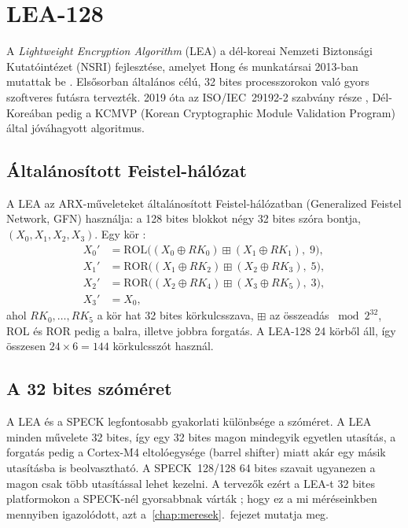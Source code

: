 \documentclass[a4paper,12pt]{report}
\theoremstyle{definition}
\theoremstyle{remark}
\begin{document}
\section{LEA-128}\label{sec:lea}

A \emph{Lightweight Encryption Algorithm} (LEA) a dél-koreai Nemzeti Biztonsági Kutatóintézet (NSRI) fejlesztése, amelyet Hong és munkatársai 2013-ban mutattak be \cite{Hong2013}. Elsősorban általános célú, 32 bites processzorokon való gyors szoftveres futásra tervezték. 2019 óta az ISO/IEC~29192-2 szabvány része \cite{ISO29192}, Dél-Koreában pedig a KCMVP (Korean Cryptographic Module Validation Program) által jóváhagyott algoritmus.

\subsection{Általánosított Feistel-hálózat}\label{sec:lea_kor}

A LEA az ARX-műveleteket általánosított Feistel-hálózatban (Generalized Feistel Network, GFN) használja: a 128 bites blokkot négy 32 bites szóra bontja, $(X_0, X_1, X_2, X_3)$. Egy kör \cite{Hong2013}:
\begin{align}
X_0' &= \text{ROL}\big((X_0 \oplus RK_0) \mathbin{\boxplus} (X_1 \oplus RK_1),\; 9\big), \\
X_1' &= \text{ROR}\big((X_1 \oplus RK_2) \mathbin{\boxplus} (X_2 \oplus RK_3),\; 5\big), \\
X_2' &= \text{ROR}\big((X_2 \oplus RK_4) \mathbin{\boxplus} (X_3 \oplus RK_5),\; 3\big), \\
X_3' &= X_0,
\end{align}
ahol $RK_0, \ldots, RK_5$ a kör hat 32 bites körkulcsszava, $\boxplus$ az összeadás $\bmod 2^{32}$, ROL és ROR pedig a balra, illetve jobbra forgatás. A LEA-128 24 körből áll, így összesen $24 \times 6 = 144$ körkulcsszót használ.

\subsection{A 32 bites szóméret}

A LEA és a SPECK legfontosabb gyakorlati különbsége a szóméret. A LEA minden művelete 32 bites, így egy 32 bites magon mindegyik egyetlen utasítás, a forgatás pedig a Cortex-M4 eltolóegysége (barrel shifter) miatt akár egy másik utasításba is beolvasztható. A SPECK~128/128 64 bites szavait ugyanezen a magon csak több utasítással lehet kezelni. A tervezők ezért a LEA-t 32 bites platformokon a SPECK-nél gyorsabbnak várták \cite{Hong2013}; hogy ez a mi méréseinkben mennyiben igazolódott, azt a~\ref{chap:meresek}.~fejezet mutatja meg.
\end{document}
